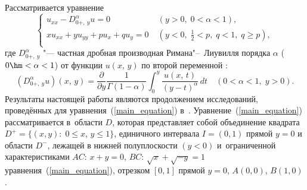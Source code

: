 \date{20/XII/2010} 


\maketitle



Рассматривается уравнение
\begin{equation}\label{main_equation}
    \left\{
    \begin{array}{ll}
      u_{xx}-D_{0+,\:y}^{\alpha}u=0\;&(y>0,\;0<\alpha<1),\\
      xu_{xx}+yu_{yy}+pu_x+qu_y=0\;&(y<0,\;\frac{1}{2}<p,\;q<1,\;q\geqslant p),\\
    \end{array}
    \right.
\end{equation}
где $D_{0+,\:y}^{\alpha}$ "--- частная дробная производная Римана"--~Лиувилля порядка $\alpha$ \linebreak ($0\hm<\alpha<1$) от функции $u(x,\,y)$ по второй
переменной \cite[c.~341]{sayg:SKM}:
\begin{equation*}%
 \left(D_{0+,\:y}^{\alpha}u\right)(x,\,y)=\frac{\partial}{\partial y}\frac{1}{\Gamma(1-\alpha)}\int _0^y\frac{u(x,\,t)}{(y-t)^{\alpha}}\,dt\quad (0<\alpha<1,\;y>0).
\end{equation*}
Результаты настоящей работы являются продолжением исследований, проведённых для уравнения~(\ref{main_equation}) в~\cite{sayg:KR1}.
Уравнение~(\ref{main_equation}) рассматривается в~области $D$, которая представляет собой объединение квадрата $D^+=\{(x,y):\;0\leqslant x$, $ y\leqslant1\}$, единичного интервала $I=(0, 1)$ прямой $y=0$ и области $D^-$, лежащей в нижней полуплоскости $(y<0)$ и~ограниченной характеристиками $AC$: $x+y=0$, $BC$: $\sqrt{x}+\sqrt{-y}=1$ уравнения~(\ref{main_equation}), отрезком $[0, 1]$ прямой $y=0$, $A(0, 0)$, $B(1, 0)$.

